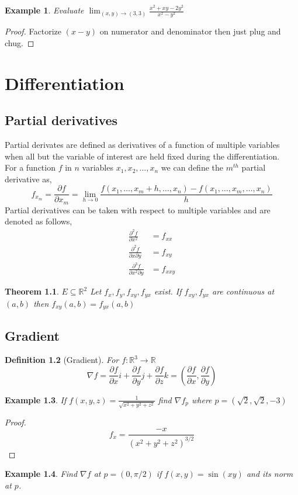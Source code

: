 \documentclass[oneside,11pt,pdftex]{book}%
\numberwithin{equation}{section}
\newtheorem{theorem}{Theorem}[chapter]%
\newtheorem{example}[theorem]{Example}
\newtheorem{definition}[theorem]{Definition}
\numberwithin{section}{chapter}
\numberwithin{equation}{chapter}
\newcommand{\R}{\mathbb{R}}
\begin{document}
\begin{example}
	Evaluate $ \lim_{(x,y)\rightarrow (3,3)} \frac{x^2+xy-2y^2}{x^2-y^2}$
\end{example}
\begin{proof}
	Factorize $ (x-y) $ on numerator and denominator then just plug and chug.
\end{proof}




\chapter{Differentiation}
\section{Partial derivatives}
Partial derivates are defined as derivatives of a function of multiple variables when all but the variable of interest are held fixed during the differentiation.\\
For a function $ f $ in $ n $ variables $ x_1,x_2,\dots, x_n $ we can define the $ m^{th} $ partial derivative as,
\[ f_{x_m}=\frac{\partial f}{\partial x_m} = \lim_{h \rightarrow 0}\frac{f(x_1,\dots, x_m+h,\dots,x_n)-f(x_1,\dots,x_m, \dots,x_n)}{h}\]
Partial derivatives can be taken with respect to multiple variables and are denoted as follows,
\begin{align*}
	\frac{\partial^2 f}{\partial x^2}&=f_{xx}\\
	\frac{\partial^2 f}{\partial x \partial y}&=f_{xy}\\
	\frac{\partial^3 f}{\partial x^2 \partial y}&=f_{xxy}
\end{align*}

\begin{theorem}
	$ E \subseteq \R^2 $ Let $ f_x, f_y, f_{xy} , f_{yx}$ exist. If $ f_{xy} , f_{yx}$ are continuous at $ (a,b) $ then $ f_{xy}(a,b)=f_{yx} (a,b)$
 \end{theorem}
\section{Gradient}
\begin{definition}[Gradient]
	For $ f:\R^3 \rightarrow \R $
	\[ \nabla f = \frac{\partial f }{\partial x} i+ \frac{\partial f }{\partial y}j + \frac{\partial f}{\partial z}k=\left(\frac{\partial f}{\partial x}, \frac{\partial f }{\partial y}\right)\]
\end{definition}
\begin{example}
	If $ f(x,y,z)=\frac{1}{\sqrt{x^2+y^2+z^2}} $ find $ \nabla f_p $ where $ p=(\sqrt{2},\sqrt{2}, -3) $
\end{example}
\begin{proof}
	\[ f_x=\frac{-x}{(x^2+y^2+z^2)^{3/2}} \]
\end{proof}
\begin{example}
	Find $ \nabla f $ at $ p=(0,\pi/2) $ if $ f(x,y) = \sin (xy)$ and its norm at $ p $.
\end{example}
\end{document}
